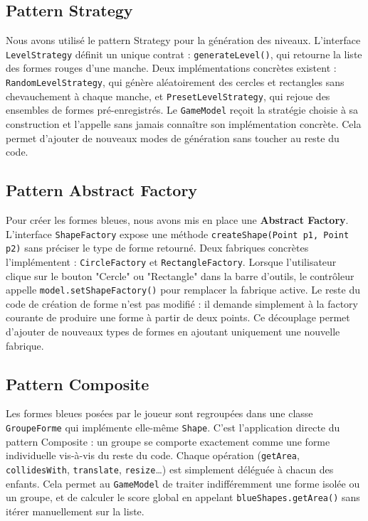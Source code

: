\documentclass{article}
\begin{document}
\subsection{Pattern Strategy}
Nous avons utilisé le pattern Strategy pour la génération des niveaux. L'interface \texttt{LevelStrategy} définit un unique contrat : \texttt{generateLevel()}, qui retourne la liste des formes rouges d'une manche. Deux implémentations concrètes existent : \texttt{RandomLevelStrategy}, qui génère aléatoirement des cercles et rectangles sans chevauchement à chaque manche, et \texttt{PresetLevelStrategy}, qui rejoue des ensembles de formes pré-enregistrés. Le \texttt{GameModel} reçoit la stratégie choisie à sa construction et l'appelle sans jamais connaître son implémentation concrète. Cela permet d'ajouter de nouveaux modes de génération sans toucher au reste du code.

\subsection{Pattern Abstract Factory}
Pour créer les formes bleues, nous avons mis en place une \textbf{Abstract Factory}. L'interface \texttt{ShapeFactory} expose une méthode \texttt{createShape(Point p1, Point p2)} sans préciser le type de forme retourné. Deux fabriques concrètes l'implémentent : \texttt{CircleFactory} et \texttt{RectangleFactory}. Lorsque l'utilisateur clique sur le bouton "Cercle" ou "Rectangle" dans la barre d'outils, le contrôleur appelle \texttt{model.setShapeFactory()} pour remplacer la fabrique active. Le reste du code de création de forme n'est pas modifié : il demande simplement à la factory courante de produire une forme à partir de deux points. Ce découplage permet d'ajouter de nouveaux types de formes en ajoutant uniquement une nouvelle fabrique.

\subsection{Pattern Composite}
Les formes bleues posées par le joueur sont regroupées dans une classe \texttt{GroupeForme} qui implémente elle-même \texttt{Shape}. C'est l'application directe du pattern Composite : un groupe se comporte exactement comme une forme individuelle vis-à-vis du reste du code. Chaque opération (\texttt{getArea}, \texttt{collidesWith}, \texttt{translate}, \texttt{resize}…) est simplement déléguée à chacun des enfants. Cela permet au \texttt{GameModel} de traiter indifféremment une forme isolée ou un groupe, et de calculer le score global en appelant \texttt{blueShapes.getArea()} sans itérer manuellement sur la liste.
\end{document}
